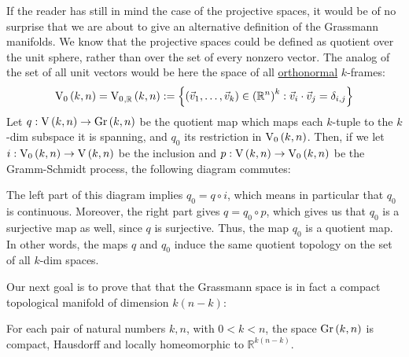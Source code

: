 If the reader has still in mind the case of the projective spaces, it would be of no surprise that we are about to give an alternative definition of the Grassmann manifolds. We know that the projective spaces could be defined as quotient over the unit sphere, rather than over the set of every nonzero vector. The analog of the set of all unit vectors would be here the space of all \ul{orthonormal} $k$-frames:
$$\StO{k}{n}=\StO{k}{n}{\mathbb{R}}:=\left\{\left(\vec{v}_1,\ldots,\vec{v}_k\right)\in\left(\mathbb{R}^n\right)^k:\vec{v}_i\cdot\vec{v}_j=\delta_{i,j}\right\}$$
Let $q:\St{k}{n}\to\Gr{k}{n}$ be the quotient map which maps each $k$-tuple to the $k$-dim subspace it is spanning, and $q_0$ its restriction in $\StO{k}{n}$. Then, if we let $i:\StO{k}{n}\to\St{k}{n}$ be the inclusion and $p:\St{k}{n}\to\StO{k}{n}$ be the Gramm-Schmidt process, the following diagram commutes:
\begin{center}
\end{center}
The left part of this diagram implies $q_0=q\circ i$, which means in particular that $q_0$ is continuous. Moreover, the right part gives $q=q_0\circ p$, which gives us that $q_0$ is a surjective map as well, since $q$ is surjective. Thus, the map $q_0$ is a quotient map. In other words, the maps $q$ and $q_0$ induce the same quotient topology on the set of all $k$-dim spaces.

Our next goal is to prove that that the Grassmann space is in fact a compact topological manifold of dimension $k(n-k)$:
\begin{lemma} For each pair of natural numbers $k,n$, with $0<k<n$, the space $\Gr{k}{n}$ is compact, Hausdorff and locally homeomorphic to $\mathbb{R}^{k(n-k)}$. 
\end{lemma}

